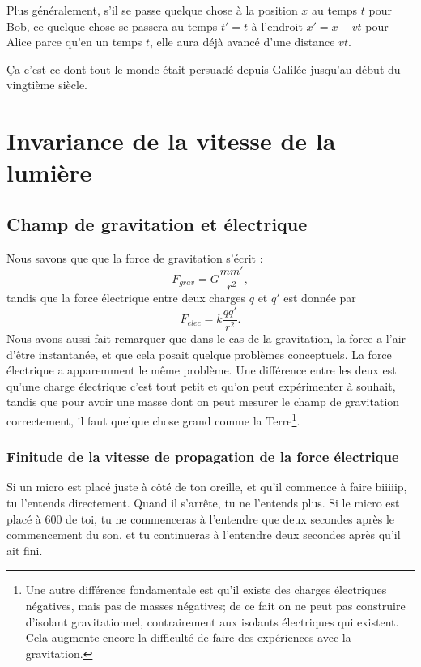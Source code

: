 Plus généralement, s'il se passe quelque chose à la position $x$ au temps $t$ pour Bob, ce quelque chose se passera au temps $t'=t$ à l'endroit $x'=x-vt$ pour Alice parce qu'en un temps $t$, elle aura déjà avancé d'une distance $vt$.

Ça c'est ce dont tout le monde était persuadé depuis Galilée jusqu'au début du vingtième siècle.

%
   \section{Invariance de la vitesse de la lumière}
%

\subsection{Champ de gravitation et électrique}

Nous savons que que la force de gravitation s'écrit :
\[ 
  F_{grav}=G\frac{ mm' }{ r^2 },
\]
tandis que la force électrique entre deux charges $q$ et $q'$ est donnée par
\begin{equation}	\label{EqRappelFelec}
  F_{elec}=k\frac{ qq' }{ r^2 }.
\end{equation}
Nous avons aussi fait remarquer que dans le cas de la gravitation, la force a l'air d'être instantanée, et que cela posait quelque problèmes conceptuels. La force électrique a apparemment le même problème. Une différence entre les deux est qu'une charge électrique c'est tout petit et qu'on peut expérimenter à souhait, tandis que pour avoir une masse dont on peut mesurer le champ de gravitation correctement, il faut quelque chose grand comme la Terre\footnote{Une autre différence fondamentale est qu'il existe des charges électriques négatives, mais pas de masses négatives; de ce fait on ne peut pas construire d'isolant gravitationnel, contrairement aux isolants électriques qui existent. Cela augmente encore la difficulté de faire des expériences avec la gravitation.}.

\subsubsection{Finitude de la vitesse de propagation de la force électrique}

Si un micro est placé juste à côté de ton oreille, et qu'il commence à faire biiiiip, tu l'entends directement. Quand il s'arrête, tu ne l'entends plus. Si le micro est placé à \unit{600}{\meter} de toi, tu ne commenceras à l'entendre que deux secondes après le commencement du son, et tu continueras à l'entendre deux secondes après qu'il ait fini.

